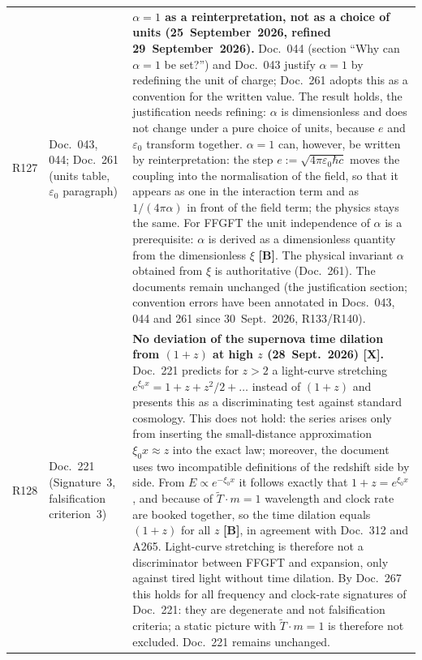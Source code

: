 \begin{longtable}{@{}p{0.9cm}p{3.1cm}p{10.2cm}@{}}
R127 & Doc.~043, 044; Doc.~261 (units table, $\varepsilon_0$ paragraph) & \textbf{$\alpha=1$ as a reinterpretation, not as a choice of units (25~September~2026, refined 29~September~2026).} Doc.~044 (section ``Why can $\alpha=1$ be set?'') and Doc.~043 justify $\alpha=1$ by redefining the unit of charge; Doc.~261 adopts this as a convention for the written value. The result holds, the justification needs refining: $\alpha$ is dimensionless and does not change under a pure choice of units, because $e$ and $\varepsilon_0$ transform together. $\alpha=1$ can, however, be written by reinterpretation: the step $e:=\sqrt{4\pi\varepsilon_0\hbar c}$ moves the coupling into the normalisation of the field, so that it appears as one in the interaction term and as $1/(4\pi\alpha)$ in front of the field term; the physics stays the same. For FFGFT the unit independence of $\alpha$ is a prerequisite: $\alpha$ is derived as a dimensionless quantity from the dimensionless $\xi$ \textbf{[B]}. The physical invariant $\alpha$ obtained from $\xi$ is authoritative (Doc.~261). The documents remain unchanged (the justification section; convention errors have been annotated in Docs.~043, 044 and 261 since 30~Sept.~2026, R133/R140). \\
R128 & Doc.~221 (Signature~3, falsification criterion~3) & \textbf{No deviation of the supernova time dilation from $(1+z)$ at high $z$ (28~Sept.~2026) [X].} Doc.~221 predicts for $z>2$ a light-curve stretching $e^{\xi_0 x}=1+z+z^2/2+\ldots$ instead of $(1+z)$ and presents this as a discriminating test against standard cosmology. This does not hold: the series arises only from inserting the small-distance approximation $\xi_0 x\approx z$ into the exact law; moreover, the document uses two incompatible definitions of the redshift side by side. From $E\propto e^{-\xi_0 x}$ it follows exactly that $1+z=e^{\xi_0 x}$, and because of $\tilde T\cdot m=1$ wavelength and clock rate are booked together, so the time dilation equals $(1+z)$ for all $z$ \textbf{[B]}, in agreement with Doc.~312 and A265. Light-curve stretching is therefore not a discriminator between FFGFT and expansion, only against tired light without time dilation. By Doc.~267 this holds for all frequency and clock-rate signatures of Doc.~221: they are degenerate and not falsification criteria; a static picture with $\tilde T\cdot m=1$ is therefore not excluded. Doc.~221 remains unchanged. \\

\end{longtable}
